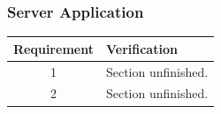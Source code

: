 \subsubsection{Server Application}
\begin{table}[!h]
	\begin{center}
		\begin{tabular}{ | c |  p{12cm} | }
			\hline
			\textbf{Requirement} & \textbf{Verification} \\ \hline
			1 & Section unfinished.\\ \hline
			2 & Section unfinished.\\ 
			\hline
		\end{tabular}
	\end{center}
\end{table}
\clearpage